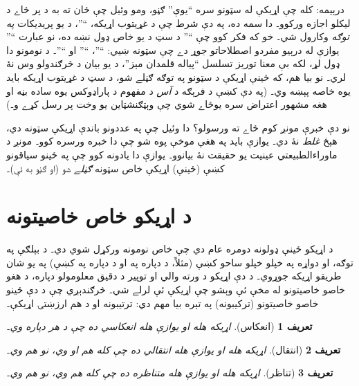 \documentclass[12pt,a4paper,oneside]{report}
\newcommand{\Pow}[1]{\wp(#1)}
\newcommand{\Nat}{\mathbb{N}}
\newcommand{\tuple}[1]{\langle #1\rangle}
\newcommand{\olfileid}[3]{\gdef\pspart{#1}\gdef\pschapter{#2}\gdef\pssection{#3}}
\newcommand{\olsection}[1]{\section{#1}\label{\pspart:\pschapter:\pssection:sec}}
\newenvironment{intro}{}{}
\newtheorem{defn}{تعريف}[section]
\begin{document}
درېيمه: کله چې اړيکې له سټونو سره ``يوې'' ګڼو، ومو وئيل چې ځان ته
به د \LR{$\tuple{x,y} \in R$} پر ځاے د  ليکلو اجازه ورکوو۔ دا سمه
ده، په دې شرط چې د غړيتوب اړيکه، ``\LR{$\in$}''، د يو پريديکات
\emph{په توګه} وکارول شي۔ خو که فکر کوو چې ``\LR{$\in$}'' د سټ د يو
خاص ډول نښه ده، نو عبارت ``\LR{$\tuple{x,y} \in R$}'' يوازې له درېيو
مفردو اصطلاحاتو جوړ دے چې سټونه ښيي: ``\LR{$\tuple{x,y}$}''، ``\LR{$\in$}''
او ``''۔ د نومونو دا ډول لړ، لکه بې معنا توريز تسلسل ``پياله
قلمدان مېز''، د يو بیان د څرګندولو وس نۀ لري۔ نو بيا هم، که ځينې
اړيکې د سټونو په توګه ګڼلے شو، د سټ د غړيتوب اړيکه بايد يوه خاصه
پېښه وي۔ (په دې کښې د فرېګه د \emph{آس} د مفهوم د پاراډوکس يوه
ساده بڼه او هغه مشهور اعتراض سره يوځاے شوي چې وېټګنشټاين يو وخت
پر رسل کړے و۔)

نو دې خبرې مونږ کوم ځاے ته ورسولو؟ دا وئيل چې په عددونو باندې
اړيکې سټونه دي، هېڅ \emph{غلط} نۀ دي۔ يوازې بايد په هغې موخې پوه
شو چې دا خبره ورسره کوو۔ مونږ د ماوراءالطبيعتي عينيت يو حقيقت نۀ
بيانوو۔ يوازې دا يادونه کوو چې په ځينو سياقونو کښې (ځينې) اړيکې
خاص سټونه \emph{ګڼلے} شو (او ګڼو به ئې)۔




\olfileid{sfr}{rel}{prp}
\olsection{د اړيکو خاص خاصيتونه}

\begin{intro}
د اړيکو ځينې ډولونه دومره عام دي چې خاص نومونه ورکړل شوي دي۔
د بېلګې په توګه، \LR{$\le$} او \LR{$\subseteq$} دواړه په خپلو خپلو ساحو کښې
(مثلاً، د \LR{$\le$} دپاره په \LR{$\Nat$} او د \LR{$\subseteq$} دپاره په \LR{$\Pow{A}$}
کښې) په يو شان طريقو اړيکه جوړوي۔ د دې اړيکو د ورته والي او توپير
د دقيق معلومولو دپاره، د هغو خاصو خاصيتونو له مخې ئې وېشو چې
اړيکې ئې لرلے شي۔ څرګندېږي چې د دې ځينو خاصو خاصيتونو (ترکيبونه)
په تېره بيا مهم دي: ترتيبونه او د هم ارزښتۍ اړيکې۔
\end{intro}

\begin{defn}[انعکاس]
اړيکه  هله او يوازې هله \emph{انعکاسي} ده چې
د هر  دپاره  وي۔
\end{defn}

\begin{defn}[انتقال]
اړيکه  هله او يوازې هله \emph{انتقالي} ده چې
کله هم  او  وي، نو  هم وي۔
\end{defn}

\begin{defn}[تناظر]
اړيکه  هله او يوازې هله \emph{متناظره} ده چې
کله هم  وي، نو  هم وي۔
\end{defn}
\end{document}
